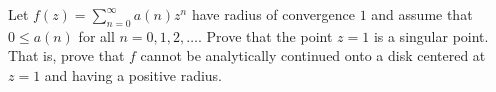Let $f(z)=\sum_{n=0}^{\infty}a(n)z^n$ have radius of convergence $1$
and assume that $0\leq a(n)$ for all $n=0,1,2,\ldots $. Prove that the
point $z=1$ is a singular point. That is, prove that $f$ cannot be
analytically continued onto a disk centered at $z=1$ and having a
positive radius.
